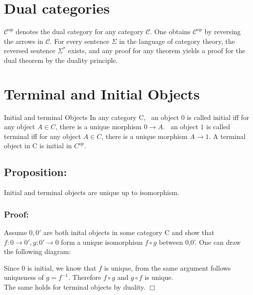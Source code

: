  \section {Dual categories}

 $\mathscr{C}^{op}$ denotes the dual category for any category $\mathscr{C}$. One obtains $\mathscr{C}^{op}$ by reversing the arrows in $\mathscr{C}$. For every sentence $\Sigma$ in the language of category theory, the reversed sentence $\Sigma^*$ exists, and any proof for any theorem yields a proof for the dual theorem by the duality principle.

\section {Terminal and Initial Objects}
\begin {definition}{Initial and terminal Objects}
  In any category C,
  \ an object $0$ is called initial iff for any object $A \in C$, there is a unique morphism $0 \to A$.
  \ an object $1$ is called terminal iff for any object $A \in C$, there is a unique morphism $A \to 1$. A terminal object in C is initial in $C^{op}$.

\end {definition}

\subsection {Proposition:}
   Initial and terminal objects are unique up to isomorphism.

\subsubsection {Proof:}
   Assume $0, 0'$ are both inital objects in some category C and show that $f: 0 \to 0', g: 0' \to 0$ form a unique isomorphism $f \circ g$ between 0,0'. One can draw the following diagram:
  
 

  Since $0$ is initial, we know that $f$ is unique, from the same argument follows uniqueness of $g = f^{-1}$. Therefore $f \circ g$ and $g \circ f$ is unique.    
    \\ The same holds for terminal objects by duality. $\Box$

